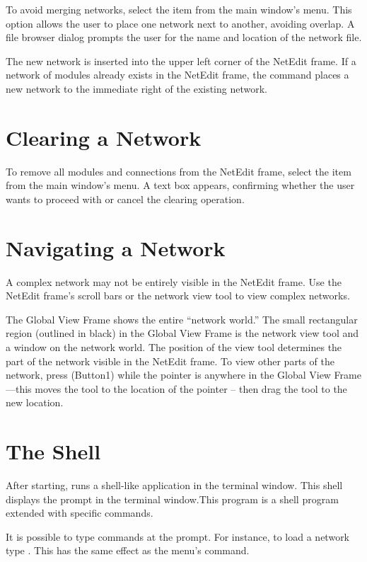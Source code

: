 To avoid merging networks, select the
 item from the main window's  menu. This
option allows the user to place one \sr{} network next to another,
avoiding overlap.  A file browser dialog prompts the user for the name and
location of the network file.

The new network is inserted into the upper left corner of the
NetEdit frame.  If a network of modules already exists in the NetEdit
frame, the  command places a new network to the
immediate right of the existing network.

\section{Clearing a Network}
\label{sec:clearnetwork}

To remove all modules and connections from the 
NetEdit frame, select the  item from the main window's
 menu.  A text box appears, confirming whether the
user wants to proceed with or cancel the clearing operation.

\section{Navigating a Network}
\label{sec:navnetwork}

A complex network may not be entirely visible in the NetEdit frame.
Use the NetEdit frame's scroll bars or the network view tool to view
complex networks.

The Global View Frame shows the entire ``network world.''  The small
rectangular region (outlined in black) in the Global View Frame is the
network view tool and a window on the network world. The position of
the view tool determines the part of the network visible in the
NetEdit frame.  To view other parts of the network, press
\keyboard(Button1) while the pointer is anywhere in the Global View
Frame---this moves the tool to the location of the pointer -- then
drag the tool to the new location.


\section{The \sr{} Shell}
\label{sec:termapp}

After starting, \sr{} runs a shell-like application in the terminal
window. This shell displays the prompt
 in the terminal window.This program is a
 shell program extended with
\sr{} specific commands.

It is possible to type \tcl{} \sr{} commands at the prompt.  For
instance, to load a network type .  This has the same effect as the 
menu's  command.
